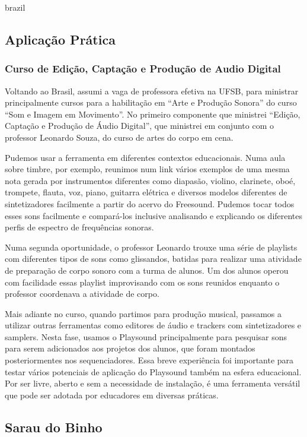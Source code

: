 \begin{otherlanguage*}{brazil}
\subsection{Aplicação Prática}

\subsubsection{Curso de Edição, Captação e Produção de Audio Digital}

Voltando ao Brasil, assumi a vaga de professora efetiva na UFSB, para ministrar principalmente cursos para a habilitação em ``Arte e Produção Sonora'' do curso ``Som e Imagem em Movimento''. No primeiro componente que ministrei ``Edição, Captação e Produção de Áudio Digital'', que ministrei em conjunto com o professor Leonardo Souza, do curso de artes do corpo em cena.

Pudemos usar a ferramenta em diferentes contextos educacionais. Numa aula sobre timbre, por exemplo, reunimos num link vários exemplos de uma mesma nota gerada por instrumentos diferentes como diapasão, violino, clarinete, oboé, trompete, flauta, voz, piano, guitarra elétrica e diversos modelos diferentes de sintetizadores facilmente a partir do acervo do Freesound. Pudemos tocar todos esses sons facilmente e compará-los inclusive analisando e explicando os diferentes perfis de espectro de frequências sonoras.

Numa segunda oportunidade, o professor Leonardo trouxe uma série de playlists com diferentes tipos de sons como glissandos, batidas para realizar uma atividade de preparação de corpo sonoro com a turma de alunos. Um dos alunos operou com facilidade essas playlist improvisando com os sons reunidos enquanto o professor coordenava a atividade de corpo. 

Mais adiante no curso, quando partimos para produção musical, passamos a utilizar outras ferramentas como editores de áudio e trackers com sintetizadores e samplers. Nesta fase, usamos o Playsound principalmente para pesquisar sons para serem adicionados aos projetos dos alunos, que foram montados posteriormentes nos sequenciadores. Essa breve experiência foi importante para testar vários potenciais de aplicação do Playsound também na esfera educacional. Por ser livre, aberto e sem a necessidade de instalação, é uma ferramenta versátil que pode ser adotada por educadores em diversas práticas.


\subsection{Sarau do Binho}


\end{otherlanguage*}
